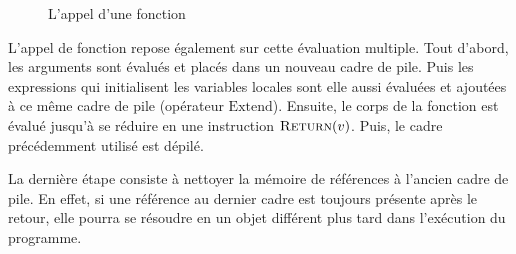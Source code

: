 \shorthandoff{!}
\begin{figure}

  \centering


  \caption{L'appel d'une fonction}
  \label{fig:fcall-details}

\end{figure}
\shorthandon{!}

L'appel de fonction repose également sur cette évaluation multiple. Tout
d'abord, les arguments sont évalués et placés dans un nouveau cadre de pile.
Puis les expressions qui initialisent les variables locales sont elle aussi
évaluées et ajoutées à ce même cadre de pile (opérateur $\mathrm{Extend}$).
Ensuite, le corps de la fonction est évalué jusqu'à se réduire en une
instruction $\textsc{Return}(v)$. Puis, le cadre précédemment utilisé est dépilé.

La dernière étape consiste à nettoyer la mémoire de références à l'ancien cadre
de pile. En effet, si une référence au dernier cadre est toujours présente après
le retour, elle pourra se résoudre en un objet différent plus tard dans
l'exécution du programme.

